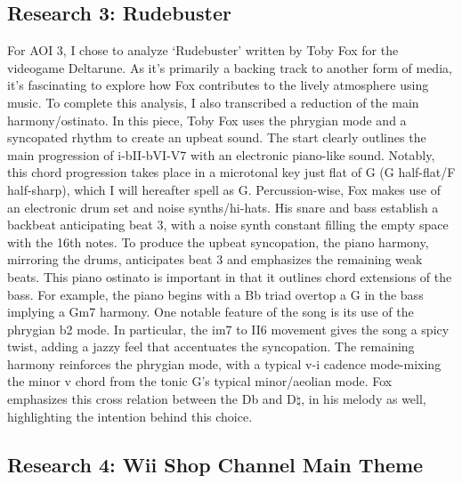 \documentclass[11pt,a4paper]{article}
\begin{document}
\subsection{Research 3: Rudebuster}

For AOI 3, I chose to analyze ‘Rudebuster’ written by Toby Fox for the videogame Deltarune. As it's primarily a backing track to another form of media, it's fascinating to explore how Fox contributes to the lively atmosphere using music. To complete this analysis, I also transcribed a reduction of the main harmony/ostinato.
In this piece, Toby Fox uses the phrygian mode and a syncopated rhythm to create an upbeat sound. The start clearly outlines the main progression of i-bII-bVI-V7 with an electronic piano-like sound. Notably, this chord progression takes place in a microtonal key just flat of G (G half-flat/F half-sharp), which I will hereafter spell as G. Percussion-wise, Fox makes use of an electronic drum set and noise synths/hi-hats. His snare and bass establish a backbeat anticipating beat 3, with a noise synth constant filling the empty space with the 16th notes. To produce the upbeat syncopation, the piano harmony, mirroring the drums, anticipates beat 3 and emphasizes the remaining weak beats. This piano ostinato is important in that it outlines chord extensions of the bass. For example, the piano begins with a Bb triad overtop a G in the bass implying a Gm7 harmony.
One notable feature of the song is its use of the phrygian b2 mode. In particular, the im7 to II6 movement gives the song a spicy twist, adding a jazzy feel that accentuates the syncopation. The remaining harmony reinforces the phrygian mode, with a typical v-i cadence mode-mixing the minor v chord from the tonic G’s typical minor/aeolian mode. Fox emphasizes this cross relation between the Db and D$\natural$, in his melody as well, highlighting the intention behind this choice.\autocite{rudebuster}

\subsection{Research 4: Wii Shop Channel Main Theme}
\end{document}
